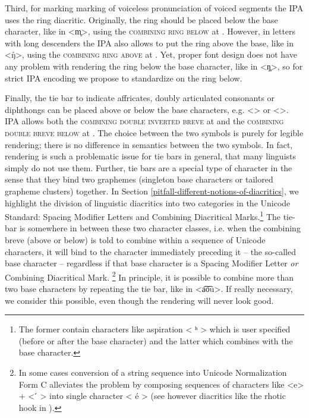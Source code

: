 Third, for marking marking of voiceless pronunciation of voiced segments the IPA
uses the ring diacritic. Originally, the ring should be placed below the 
base character, like in <m̥>, using the \textsc{combining ring below} at . 
However, in letters with long descenders the IPA also allows to put the ring 
above the base, like in <ŋ̊>, using the \textsc{combining ring above} at 
. Yet, proper font design does not have any problem with rendering 
the ring below the base character, like in <ŋ̥>, so for strict IPA encoding we 
propose to standardize on the ring below.

Finally, the tie bar to indicate affricates, doubly articulated consonants or
diphthongs can be placed above or below the base characters, e.g.
<> or <>. IPA allows both the \textsc{combining double inverted
breve} at  and the \textsc{combining double breve below} at . The  
choice between the two symbols is purely for legible rendering; there is no difference 
in semantics between the two symbols. In fact, rendering is such a problematic issue 
for tie bars in general, that many linguists simply do not use them. Further, tie bars 
are a special type of character in the sense that they bind two graphemes (singleton base characters 
or tailored grapheme clusters) together. In Section \ref{pitfall-different-notions-of-diacritics}, 
we highlight the division of linguistic diacritics 
into two categories in the Unicode Standard: Spacing Modifier Letters and Combining 
Diacritical Marks.\footnote{The former contain characters like aspiration < ʰ > which is user 
specified (before or after the base character) and the latter which combines 
with the base character.} The tie-bar is somewhere in between these two character 
classes, i.e. when the combining breve (above or below) is told to combine within 
a sequence of Unicode characters, it will bind to the character immediately 
preceding it -- the so-called base character -- regardless if that base 
character is a Spacing Modifier Letter \textit{or} Combining Diacritical Mark. \footnote{In some cases 
conversion of a string sequence into Unicode Normalization Form C alleviates 
the problem by composing sequences of characters like <e> + < ́ > into single character < é > 
(see however diacritics like the rhotic hook in ).} In principle, 
it is possible to combine more than two base characters by repeating the tie bar, 
like in <a͡o͡u>. If really necessary, we consider this possible, even though the 
rendering will never look good.

